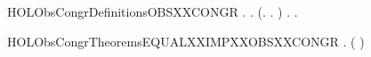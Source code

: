 \newcommand{\HOLObsCongrDate}{12 Giugno 2018}
\newcommand{\HOLObsCongrTime}{01:12}
\begin{SaveVerbatim}{HOLObsCongrDefinitionsOBSXXCONGR}
\HOLTokenTurnstile{} \HOLSymConst{\HOLTokenForall{}} .
          \HOLSymConst{\HOLTokenEquiv{}}
       \HOLSymConst{\HOLTokenForall{}}.
           (\HOLSymConst{\HOLTokenForall{}}.  \HOLTokenTransBegin{}\HOLTokenTransEnd {} \HOLSymConst{\HOLTokenImp{}} \HOLSymConst{\HOLTokenExists{}}.  \HOLTokenWeakTransBegin{}\HOLTokenWeakTransEnd {} \HOLSymConst{\HOLTokenConj{}}   ) \HOLSymConst{\HOLTokenConj{}}
           \HOLSymConst{\HOLTokenForall{}}.  \HOLTokenTransBegin{}\HOLTokenTransEnd {} \HOLSymConst{\HOLTokenImp{}} \HOLSymConst{\HOLTokenExists{}}.  \HOLTokenWeakTransBegin{}\HOLTokenWeakTransEnd {} \HOLSymConst{\HOLTokenConj{}}   
\end{SaveVerbatim}
\newcommand{\HOLObsCongrDefinitionsOBSXXCONGR}{\UseVerbatim{HOLObsCongrDefinitionsOBSXXCONGR}}
\newcommand{\HOLObsCongrDefinitions}{
\HOLDfnTag{ObsCongr}{OBS_CONGR}\HOLObsCongrDefinitionsOBSXXCONGR
}
\begin{SaveVerbatim}{HOLObsCongrTheoremsEQUALXXIMPXXOBSXXCONGR}
\HOLTokenTurnstile{} \HOLSymConst{\HOLTokenForall{}} . ( \HOLSymConst{=} ) \HOLSymConst{\HOLTokenImp{}}   
\end{SaveVerbatim}
\newcommand{\HOLObsCongrTheoremsEQUALXXIMPXXOBSXXCONGR}{\UseVerbatim{HOLObsCongrTheoremsEQUALXXIMPXXOBSXXCONGR}}
